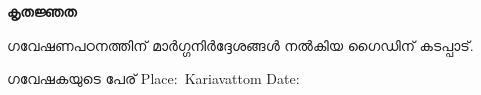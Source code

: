 \center
\textbf{\LARGE{കൃതജ്ഞത}}
\vspace{.1in}\newline


\flushleft
ഗവേഷണപഠനത്തിന് മാർഗ്ഗനിർദ്ദേശങ്ങൾ നൽകിയ ഗൈഡിന് കടപ്പാട്.

\vspace{.5in}
\flushright
ഗവേഷകയുടെ പേര്
\flushleft
Place$ :$ Kariavattom
\newline
Date$  :$\hspace*{6.4cm}

